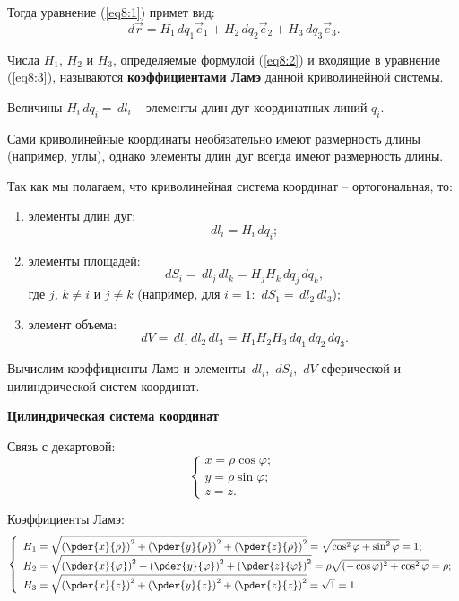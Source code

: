 	Тогда уравнение (\ref{eq8:1}) примет вид:
	\begin{equation}
	\,d\vec{r} = H_1\,d q_1\vec{e}_1 + H_2\,d q_2\vec{e}_2 + H_3\,d q_3\vec{e}_3. \label{eq8:3}
	\end{equation}
	
	\begin{definition}
	Числа \( H_1 \), \( H_2 \) и \( H_3 \), определяемые формулой (\ref{eq8:2}) и входящие в уравнение (\ref{eq8:3}), называются \textbf{коэффициентами Ламэ} данной криволинейной системы.
	\end{definition}
	
	Величины \( H_i\,d q_i = \,d l_i \) -- элементы длин дуг координатных линий \( q_i \).
	
	\begin{remark}
	Сами криволинейные координаты необязательно имеют размерность длины (например, углы), однако элементы длин дуг всегда имеют размерность длины.
	\end{remark}
	
	Так как мы полагаем, что криволинейная система координат -- ортогональная, то:
	\begin{enumerate}
	\item элементы длин дуг:
	\[ \,d l_i = H_i\,d q_i; \]
	\item элементы площадей:
	\[ \,d S_i = \,d l_j\,d l_k = H_jH_k\,d q_j\,d q_k, \]
	где \( j \), \( k \ne i \) и \( j \ne k \) (например, для \( i = 1\): \( \,d S_1 = \,d l_2\,d l_3 \));
	\item элемент объема:
	\[ \,d V = \,d l_1\,d l_2\,d l_3 = H_1H_2H_3\,d q_1\,d q_2\,d q_3. \]
	\end{enumerate}
	
	Вычислим коэффициенты Ламэ и элементы \( \,d l_i \), \( \,d S_i \), \( \,d V \) сферической и цилиндрической систем координат.

	\textbf{Цилиндрическая система координат}
	
	Связь с  декартовой:
	\[ \left\{ \begin{array}{l}
		x = \rho\cos\varphi; \\
		y = \rho\sin\varphi; \\
		z = z.
	\end{array}\right. \]
	
	Коэффициенты Ламэ:
	\[ \left\{ \begin{array}{l}
	H_1 = \sqrt{\left(\pder{x}{\rho}\right)^2 + \left(\pder{y}{\rho}\right)^2 + \left(\pder{z}{\rho}\right)^2} = \sqrt{\cos^2\varphi + \sin^2\varphi} = 1; \\
	H_2 = \sqrt{\left(\pder{x}{\varphi}\right)^2 + \left(\pder{y}{\varphi}\right)^2 + \left(\pder{z}{\varphi}\right)^2} = \rho\sqrt{(-\cos\varphi)^2 + \cos^2\varphi} = \rho; \\
	H_3 = \sqrt{\left(\pder{x}{z}\right)^2 + \left(\pder{y}{z}\right)^2 + \left(\pder{z}{z}\right)^2} = \sqrt{1} = 1.
	\end{array} \right. \]
	
